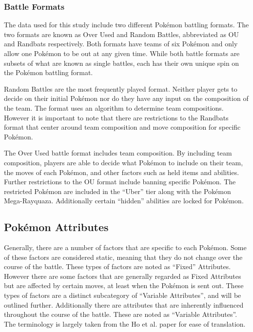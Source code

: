 \documentclass[12pt,twoside]{reedthesis}
\begin{document}
  \subsubsection{Battle Formats}\label{battle-formats}
  
  The data used for this study include two different Pokémon battling
  formats. The two formats are known as Over Used and Random Battles,
  abbreviated as OU and Randbats respectively. Both formats have teams of
  six Pokémon and only allow one Pokémon to be out at any given time.
  While both battle formats are subsets of what are known as single
  battles, each has their own unique spin on the Pokémon battling format.
  
  Random Battles are the most frequently played format. Neither player
  gets to decide on their initial Pokémon nor do they have any input on
  the composition of the team. The format uses an algorithm to determine
  team compositions. However it is important to note that there are
  restrictions to the Randbats format that center around team composition
  and move composition for specific Pokémon.
  
  The Over Used battle format includes team composition. By including team
  composition, players are able to decide what Pokémon to include on their
  team, the moves of each Pokémon, and other factors such as held items
  and abilities. Further restrictions to the OU format include banning
  specific Pokémon. The restricted Pokémon are included in the ``Uber''
  tier along with the Pokémon Mega-Rayquaza. Additionally certain
  ``hidden'' abilities are locked for Pokémon.
  
  \subsection{Pokémon Attributes}\label{pokemon-attributes}
  
  Generally, there are a number of factors that are specific to each
  Pokémon. Some of these factors are considered static, meaning that they
  do not change over the course of the battle. These types of factors are
  noted as ``Fixed'' Attributes. However there are some factors that are
  generally regarded as Fixed Attributes but are affected by certain
  moves, at least when the Pokémon is sent out. These types of factors are
  a distinct subcategory of ``Variable Attributes'', and will be outlined
  further. Additionally there are attributes that are inherently
  influenced throughout the course of the battle. These are noted as
  ``Variable Attributes''. The terminology is largely taken from the Ho et
  al. paper for ease of translation.
  
\end{document}
